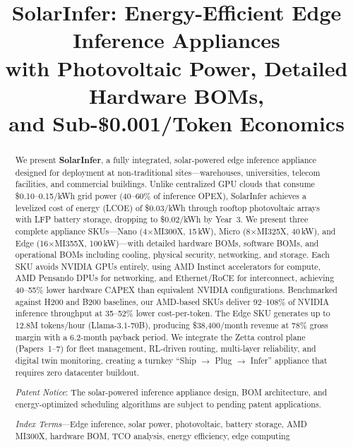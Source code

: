 \documentclass[conference,10pt,letterpaper]{IEEEtran}
\title{SolarInfer: Energy-Efficient Edge Inference Appliances\\with Photovoltaic Power, Detailed Hardware BOMs,\\and Sub-\$0.001/Token Economics}
\author{\IEEEauthorblockN{Srikanta Datta Tumkur*, Mehar Simhadri$^\dagger$, Jay Iyer$^\dagger$, Anshu Bansal*}
\IEEEauthorblockA{*MIT Sloan School of Management, Cambridge, MA \{srikanta, anshu.bansal\}@sloan.mit.edu\\$^\dagger$IEEE Senior Members \{mehar.simhadri, jay.iyer\}@ieee.org}}
\begin{document}
\maketitle

\begin{abstract}
We present \textbf{SolarInfer}, a fully integrated, solar-powered edge inference appliance designed for deployment at non-traditional sites---warehouses, universities, telecom facilities, and commercial buildings. Unlike centralized GPU clouds that consume \$0.10--0.15/kWh grid power (40--60\% of inference OPEX), SolarInfer achieves a levelized cost of energy (LCOE) of \$0.03/kWh through rooftop photovoltaic arrays with LFP battery storage, dropping to \$0.02/kWh by Year~3. We present three complete appliance SKUs---Nano (4$\times$MI300X, 15\,kW), Micro (8$\times$MI325X, 40\,kW), and Edge (16$\times$MI355X, 100\,kW)---with detailed hardware BOMs, software BOMs, and operational BOMs including cooling, physical security, networking, and storage. Each SKU avoids NVIDIA GPUs entirely, using AMD Instinct accelerators for compute, AMD Pensando DPUs for networking, and Ethernet/RoCE for interconnect, achieving 40--55\% lower hardware CAPEX than equivalent NVIDIA configurations. Benchmarked against H200 and B200 baselines, our AMD-based SKUs deliver 92--108\% of NVIDIA inference throughput at 35--52\% lower cost-per-token. The Edge SKU generates up to 12.8M tokens/hour (Llama-3.1-70B), producing \$38,400/month revenue at 78\% gross margin with a 6.2-month payback period. We integrate the Zetta control plane (Papers~1--7) for fleet management, RL-driven routing, multi-layer reliability, and digital twin monitoring, creating a turnkey ``Ship $\to$ Plug $\to$ Infer'' appliance that requires zero datacenter buildout.

\emph{Patent Notice}: The solar-powered inference appliance design, BOM architecture, and energy-optimized scheduling algorithms are subject to pending patent applications.

\emph{Index Terms}---Edge inference, solar power, photovoltaic, battery storage, AMD MI300X, hardware BOM, TCO analysis, energy efficiency, edge computing
\end{abstract}
\end{document}
